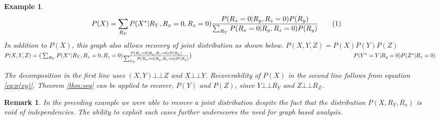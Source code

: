 \documentclass[12pt]{article}
\newcommand\numberthis{\addtocounter{equation}{1}\tag{\theequation}}
\newcommand{\compos}{\mbox{$\bot\!\!\!\bot$}}
\newtheorem{example}{Example}
\newtheorem{remark}{Remark}
\begin{document}
\begin{example}
\begin{align*}
	P(X) &= \sum_{R_Y} P(X^*|R_Y,R_x=0,R_z=0)\frac{P(R_x=0|R_y,R_z=0)P(R_y)}{\sum_{R_Y}P(R_x=0|R_y,R_z=0)P(R_y)}\numberthis \label{eq:p(xy)}
	\end{align*}
In addition to $P(X)$, this graph also allows recovery of joint distribution  as shown below. 
$
P(X,Y,Z) = P(X)P(Y)P(Z)
$\\
{\normalsize
$
P(X,Y,Z) = \big(\sum_{R_Y} P(X^*|R_Y,R_x=0,R_z=0)\frac{P(R_x=0|R_y,R_z=0)P(R_y)}{\sum_{R_Y}P(R_x=0|R_y,R_z=0)P(R_y)}\big)\\ \hspace*{10cm} P(Y^*=Y|R_y=0) P(Z^*|R_z=0)
$
}

The decomposition in the first line uses $(X,Y)\compos Z$  and $X\compos Y$. Recoverability of $P(X)$ in the second line follows from equation \ref{eq:p(xy)}. Theorem \ref{thm:seq} can be applied to recover, $P(Y)$ and $P(Z)$, since $Y \compos R_Y$ and $Z \compos R_Z$. 
\end{example}
\begin{remark}
	In the preceding example  we were able to recover a joint distribution despite the fact that the distribution  $P(X,R_Y,R_x)$ is void of independencies. The ability to exploit such cases further underscores the need for graph based analysis. 
\end{remark}
\end{document}
